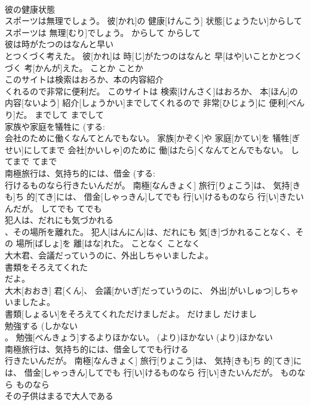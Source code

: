 \documentclass[8pt]{extreport}
\begin{document}
\begin{CJK}{UTF8}{min}
\\	彼の健康状態 
\\	スポーツは無理でしょう。	彼[かれ]の 健康[けんこう] 状態[じょうたい]からしてスポーツは 無理[むり]でしょう。	からして	からして	
\\	彼は時がたつのはなんと早い 
\\	とつくづく考えた。	彼[かれ]は 時[じ]がたつのはなんと 早[はや]いことかとつくづく 考[かんが]えた。	ことか	ことか	
\\	このサイトは検索はおろか、本の内容紹介 
\\	くれるので非常に便利だ。	このサイトは 検索[けんさく]はおろか、 本[ほん]の 内容[ないよう] 紹介[しょうかい]までしてくれるので 非常[ひじょう]に 便利[べんり]だ。	までして	までして	
\\	家族や家庭を犠牲に (する: 
\\	会社のために働くなんてとんでもない。	家族[かぞく]や 家庭[かてい]を 犠牲[ぎせい]にしてまで 会社[かいしゃ]のために 働[はたら]くなんてとんでもない。	してまで	てまで	
\\	南極旅行は、気持ち的には、借金 (する: 
\\	行けるものなら行きたいんだが。	南極[なんきょく] 旅行[りょこう]は、 気持[きも]ち 的[てき]には、 借金[しゃっきん]してでも 行[い]けるものなら 行[い]きたいんだが。	してでも	てでも	
\\	犯人は、だれにも気づかれる 
\\	、その場所を離れた。	犯人[はんにん]は、だれにも 気[き]づかれることなく、その 場所[ばしょ]を 離[はな]れた。	ことなく	ことなく	
\\	大木君、会議だっていうのに、外出しちゃいましたよ。
\\	書類をそろえてくれた 
\\	だよ。	
\\	大木[おおき] 君[くん]、 会議[かいぎ]だっていうのに、 外出[がいしゅつ]しちゃいましたよ。
\\	書類[しょるい]をそろえてくれただけましだよ。	だけまし	だけまし	
\\	勉強する (しかない 
\\	。	勉強[べんきょう]するよりほかない。	(より)ほかない	(より)ほかない	
\\	南極旅行は、気持ち的には、借金してでも行ける 
\\	行きたいんだが。	南極[なんきょく] 旅行[りょこう]は、 気持[きも]ち 的[てき]には、 借金[しゃっきん]してでも 行[い]けるものなら 行[い]きたいんだが。	ものなら	ものなら	
\\	その子供はまるで大人である 

\end{CJK}
\end{document}
